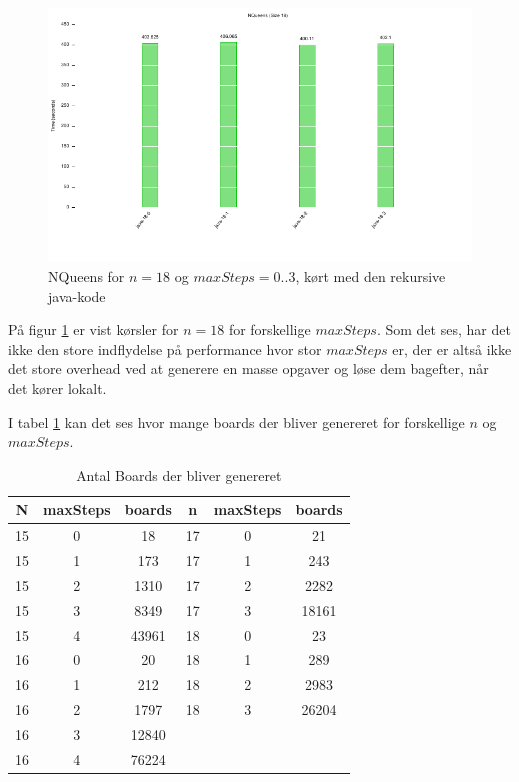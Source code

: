 \begin{figure}[h]
\begin{center}
\includegraphics{../benchmarks/maxsteps.pdf}
\caption{NQueens for $n=18$ og $maxSteps=0..3$, kørt med den rekursive java-kode} 
\label{figur:maxsteps}
\end{center}
\end{figure}

På figur \ref{figur:maxsteps} er vist kørsler for $n=18$ for forskellige
$maxSteps$. 
Som det ses, har det ikke den store indflydelse på performance hvor stor
$maxSteps$ er, der er altså ikke det store overhead ved at generere en masse
opgaver og løse dem bagefter, når det kører lokalt. 




I tabel \ref{tabel:noboards} kan det ses hvor mange boards der bliver genereret
for forskellige $n$ og $maxSteps$. 

\begin{table}
	\begin{center}
		\begin{tabular}{|c|c|c|c|c|c|}
			\hline N  & maxSteps  & boards & n  & maxSteps & boards \\
			\hline 15 & 0         & 18     & 17 & 0        & 21     \\
			\hline 15 & 1         & 173    & 17 & 1        & 243    \\
			\hline 15 & 2         & 1310   & 17 & 2        & 2282   \\ 
			\hline 15 & 3         & 8349   & 17 & 3        & 18161  \\
			\hline 15 & 4         & 43961  & 18 & 0        & 23     \\
			\hline 16 & 0         & 20     & 18 & 1        & 289    \\
			\hline 16 & 1         & 212    & 18 & 2        & 2983   \\
			\hline 16 & 2         & 1797   & 18 & 3        & 26204  \\
			\hline 16 & 3         & 12840  &    &          &        \\
			\hline 16 & 4         & 76224  &    &          &        \\
			\hline
		\end{tabular}
		\caption{Antal Boards der bliver genereret}
		\label{tabel:noboards}
	\end{center}
\end{table}

